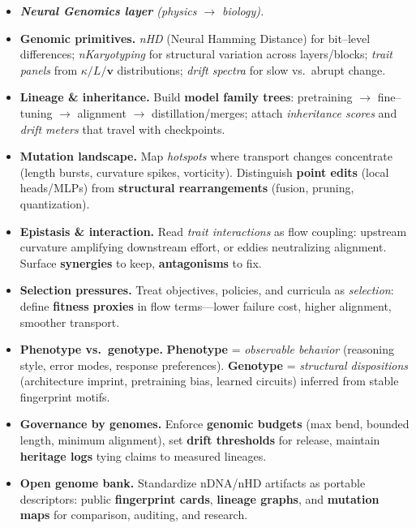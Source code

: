 \begin{itemize}[leftmargin=*,itemsep=0.45em]
  \medskip\item[] \textit{\textbf{Neural Genomics layer} (physics \(\rightarrow\) biology).}

  \item \textbf{Genomic primitives.} \emph{nHD} (Neural Hamming Distance) for bit--level differences; \emph{nKaryotyping} for structural variation across layers/blocks; \emph{trait panels} from \(\kappa/L/\mathbf{v}\) distributions; \emph{drift spectra} for slow vs.\ abrupt change.
  \item \textbf{Lineage \& inheritance.} Build \textbf{model family trees}: pretraining \(\rightarrow\) fine--tuning \(\rightarrow\) alignment \(\rightarrow\) distillation/merges; attach \emph{inheritance scores} and \emph{drift meters} that travel with checkpoints.
  \item \textbf{Mutation landscape.} Map \emph{hotspots} where transport changes concentrate (length bursts, curvature spikes, vorticity). Distinguish \textbf{point edits} (local heads/MLPs) from \textbf{structural rearrangements} (fusion, pruning, quantization).
  \item \textbf{Epistasis \& interaction.} Read \emph{trait interactions} as flow coupling: upstream curvature amplifying downstream effort, or eddies neutralizing alignment. Surface \textbf{synergies} to keep, \textbf{antagonisms} to fix.
  \item \textbf{Selection pressures.} Treat objectives, policies, and curricula as \emph{selection}: define \textbf{fitness proxies} in flow terms—lower failure cost, higher alignment, smoother transport.
  \item \textbf{Phenotype vs.\ genotype.} \textbf{Phenotype} = \emph{observable behavior} (reasoning style, error modes, response preferences). \textbf{Genotype} = \emph{structural dispositions} (architecture imprint, pretraining bias, learned circuits) inferred from stable fingerprint motifs.
  \item \textbf{Governance by genomes.} Enforce \textbf{genomic budgets} (max bend, bounded length, minimum alignment), set \textbf{drift thresholds} for release, maintain \textbf{heritage logs} tying claims to measured lineages.
  \item \textbf{Open genome bank.} Standardize nDNA/nHD artifacts as portable descriptors: public \textbf{fingerprint cards}, \textbf{lineage graphs}, and \textbf{mutation maps} for comparison, auditing, and research.
\end{itemize}


